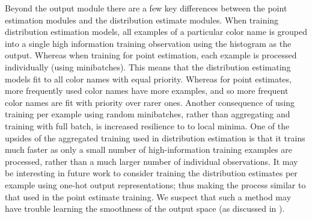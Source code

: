 \documentclass[11pt,a4paper]{article}
\begin{document}
Beyond the output module there are a few key differences between the point estimation modules and the distribution estimate modules.
When training distribution estimation models, all examples of a particular color name is grouped into a single high information training observation using the histogram as the output.
Whereas when training for point estimation, each example is processed individually (using minibatches).
This means that the distribution estimating models fit to all color names with equal priority. %
Whereas for point estimates, more frequently used color names have more examples, and so more frequent color names are fit with priority over rarer ones.
Another consequence of using training per example using random minibatches, rather than aggregating and training with full batch, is increased resilience to to local minima.
One of the upsides of the aggregated training used in distribution estimation is that it trains much faster as only a small number of high-information training examples are processed, rather than a much larger number of individual observations.
It may be interesting in future work to consider training the distribution estimates per example using one-hot output representations; thus making the process similar to that used in the point estimate training.
We suspect that such a method may have trouble learning the smoothness of the output space (as discussed in ).






\end{document}
